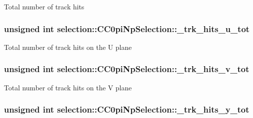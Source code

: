 Total number of track hits \hypertarget{classselection_1_1CC0piNpSelection_af7d0e867df8901ff3e531b4c1b96408a}{
\subsubsection[{\-\_\-trk\-\_\-hits\-\_\-u\-\_\-tot}]{\setlength{\rightskip}{0pt plus 5cm}unsigned int selection\-::\-C\-C0pi\-Np\-Selection\-::\-\_\-trk\-\_\-hits\-\_\-u\-\_\-tot\hspace{0.3cm}{\ttfamily [private]}}}\label{classselection_1_1CC0piNpSelection_af7d0e867df8901ff3e531b4c1b96408a}
Total number of track hits on the U plane \hypertarget{classselection_1_1CC0piNpSelection_a30fe5ccb6a299f7955125aa6c9d5923d}{
\subsubsection[{\-\_\-trk\-\_\-hits\-\_\-v\-\_\-tot}]{\setlength{\rightskip}{0pt plus 5cm}unsigned int selection\-::\-C\-C0pi\-Np\-Selection\-::\-\_\-trk\-\_\-hits\-\_\-v\-\_\-tot\hspace{0.3cm}{\ttfamily [private]}}}\label{classselection_1_1CC0piNpSelection_a30fe5ccb6a299f7955125aa6c9d5923d}
Total number of track hits on the V plane \hypertarget{classselection_1_1CC0piNpSelection_a76eb07fcb9190709464880c0ea7c4eba}{
\subsubsection[{\-\_\-trk\-\_\-hits\-\_\-y\-\_\-tot}]{\setlength{\rightskip}{0pt plus 5cm}unsigned int selection\-::\-C\-C0pi\-Np\-Selection\-::\-\_\-trk\-\_\-hits\-\_\-y\-\_\-tot\hspace{0.3cm}{\ttfamily [private]}}}\label{classselection_1_1CC0piNpSelection_a76eb07fcb9190709464880c0ea7c4eba}
